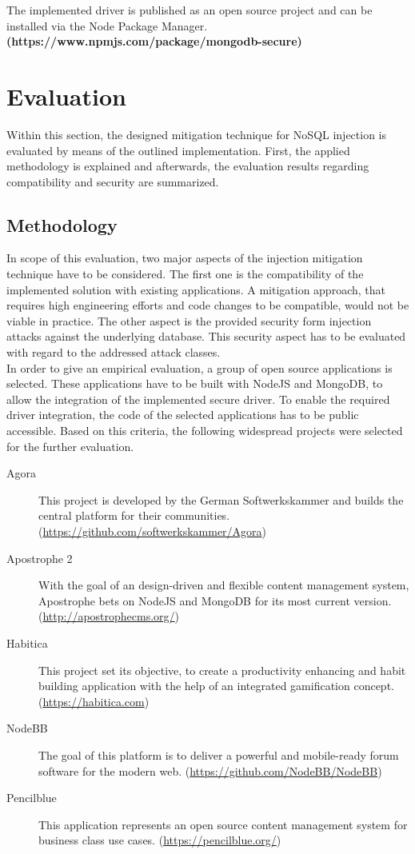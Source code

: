 The implemented driver is published as an open source project and can be installed via the Node Package Manager. \textbf{(https://www.npmjs.com/package/mongodb-secure)}


\section{Evaluation}
\label{sec:evaluation}
Within this section, the designed mitigation technique for NoSQL injection is evaluated by means of the outlined implementation. First, the applied methodology is explained and afterwards, the evaluation results regarding compatibility and security are summarized.

\subsection{Methodology}
In scope of this evaluation, two major aspects of the injection mitigation technique have to be considered. The first one is the compatibility of the implemented solution with existing applications. A mitigation approach, that requires high engineering efforts and code changes to be compatible, would not be viable in practice. The other aspect is the provided security form injection attacks against the underlying database. This security aspect has to be evaluated with regard to the addressed attack classes. \\

In order to give an empirical evaluation, a group of open source applications is selected. These applications have to be built with NodeJS and MongoDB, to allow the integration of the implemented secure driver. To enable the required driver integration, the code of the selected applications has to be public accessible. Based on this criteria, the following widespread projects were selected for the further evaluation.

\begin{description}
\item [Agora] This project is developed by the German Softwerkskammer and builds the central platform for their communities. ({\footnotesize\url{https://github.com/softwerkskammer/Agora}})
\item [Apostrophe 2] With the goal of an design-driven and flexible content management system, Apostrophe bets on NodeJS and MongoDB for its most current version.\\
({\footnotesize\url{http://apostrophecms.org/}})
\item [Habitica] This project set its objective, to create a productivity enhancing and habit building application with the help of an integrated gamification concept. ({\footnotesize\url{https://habitica.com}})
\item [NodeBB] The goal of this platform is to deliver a powerful and mobile-ready forum software for the modern web. ({\footnotesize\url{https://github.com/NodeBB/NodeBB}})
\item [Pencilblue] This application represents an open source content management system for business class use cases. ({\footnotesize\url{https://pencilblue.org/}})
\end{description}

